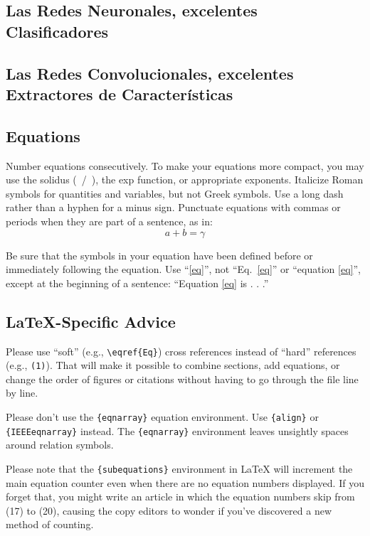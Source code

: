 \documentclass[a4paper]{IEEEtranUNT}
\begin{document}
\subsection{Las Redes Neuronales, excelentes Clasificadores}
\subsection{Las Redes Convolucionales, excelentes Extractores de Características}


\subsection{Equations}
Number equations consecutively. To make your 
equations more compact, you may use the solidus (~/~), the exp function, or 
appropriate exponents. Italicize Roman symbols for quantities and variables, 
but not Greek symbols. Use a long dash rather than a hyphen for a minus 
sign. Punctuate equations with commas or periods when they are part of a 
sentence, as in:
\begin{equation}
a+b=\gamma\label{eq}
\end{equation}

Be sure that the 
symbols in your equation have been defined before or immediately following 
the equation. Use ``\eqref{eq}'', not ``Eq.~\eqref{eq}'' or ``equation \eqref{eq}'', except at 
the beginning of a sentence: ``Equation \eqref{eq} is . . .''

\subsection{\LaTeX-Specific Advice}

Please use ``soft'' (e.g., \verb|\eqref{Eq}|) cross references instead
of ``hard'' references (e.g., \verb|(1)|). That will make it possible
to combine sections, add equations, or change the order of figures or
citations without having to go through the file line by line.

Please don't use the \verb|{eqnarray}| equation environment. Use
\verb|{align}| or \verb|{IEEEeqnarray}| instead. The \verb|{eqnarray}|
environment leaves unsightly spaces around relation symbols.

Please note that the \verb|{subequations}| environment in {\LaTeX}
will increment the main equation counter even when there are no
equation numbers displayed. If you forget that, you might write an
article in which the equation numbers skip from (17) to (20), causing
the copy editors to wonder if you've discovered a new method of
counting.
\end{document}
